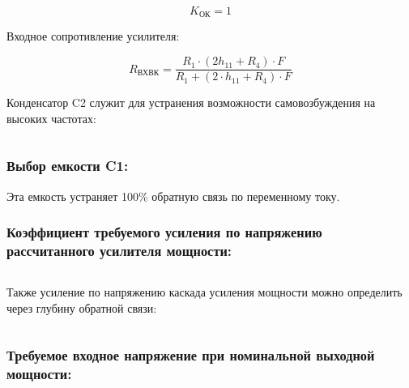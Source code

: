 \begin{equation}
\label{eq:equation4_16}

\end{equation}

\begin{equation}
\label{eq:equation4_17}
K_{\text{ОК}}=1
\end{equation}

Входное сопротивление усилителя:

\begin{equation}
\label{eq:equation4_18}
R_{\text{ВХВК}}=\dfrac{R_1 \cdot (2 h_{11}+R_4) \cdot F}{R_1+(2 \cdot h_{11}+R_{\text{4}}) \cdot F} 
\end{equation}
\begin{equation*}

\end{equation*}

Конденсатор C2 служит для устранения возможности самовозбуждения на высоких частотах:

\begin{equation}
\label{eq:equation4_19}

\end{equation}

\subsubsection{Выбор емкости C1:}

Эта емкость устраняет 100\% обратную связь по переменному току.
\begin{equation}
\label{eq:equation4_20}

\end{equation}

\subsubsection{	Коэффициент требуемого усиления по напряжению рассчитанного усилителя мощности:}

\begin{equation}
\label{eq:equation4_21}

\end{equation}

Также усиление по напряжению каскада усиления мощности можно определить через глубину обратной связи:

\begin{equation}
\label{eq:equation4_22}

\end{equation}

\subsubsection{Требуемое входное напряжение при номинальной выходной мощности:} %


